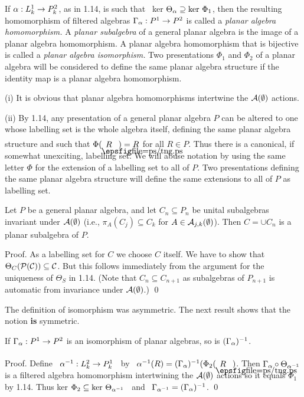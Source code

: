 If $\alpha: L^1_k\to P^2_k$, as in 1.14, is such that \
ker $\Theta_\alpha\supseteq {\bf\rm{ker}} \ \Phi_1$, then the resulting
homomorphism of filtered algebras $\Gamma_\alpha: P^1\to P^2$ is called
a {\it planar algebra homomorphism.} A {\it planar subalgebra}
of a general planar algebra is the image of a planar algebra
homomorphism. A planar algebra homomorphism that is bijective is
called a {\it planar algebra isomorphism.} Two presentations
$\Phi_1$ and $\Phi_2$ of a planar algebra will be considered to
define the same planar algebra structure if the identity map is a
planar algebra homomorphism.

 (i) It is obvious that
planar algebra homomorphisms intertwine the ${\cal A}(\emptyset)$ actions.

(ii) By 1.14, any presentation of a general planar algebra $P$ can
be altered to one whose labelling set is the whole algebra itself,
defining the same planar algebra structure and such that
$\Phi(\tangle{R})=R$ for all $R\in P$.  Thus
there is a canonical, if somewhat unexciting, labelling set.
We will abuse notation by using the same letter $\Phi$ for the
extension of a labelling set to all of $P$. Two presentations
defining the same planar algebra structure will define the same
extensions to all of $P$ as labelling set.

\bigskip
{} Let $P$ be a  general planar algebra,
and let $C_n\subseteq P_n$ be unital subalgebras invariant under
${\cal A}(\emptyset)$ (i.e., $\pi_A(C_j)\subseteq C_k$ for $A\in{\cal
A}_{j,k}(\emptyset)$). Then $C=\cup C_n$ is a planar subalgebra of $P$.

\bigskip
{\sc Proof.} As a labelling set for $C$ we choose $C$ itself.
We have to show that $\Theta_C(\cal P(C))\subseteq C$. But this follows
immediately from the argument for the uniqueness of $\Theta_S$ in
1.14. (Note that $C_n\subseteq C_{n+1}$ as subalgebras of
$P_{n+1}$ is automatic from invariance under ${\cal A}(\emptyset)$.) \qed

The definition of isomorphism
was asymmetric. The next result shows that the notion {\bf is}
symmetric.

\bs
{} If $\Gamma_{\alpha}:P^1\to P^2$ is an
isomorphism of planar algebras, so is $(\Gamma_{\alpha})^{-1}$.

\bs
{\sc Proof.} Define \ $\alpha^{-1}:L^2_k\to P^1_k$ \ by \
$\a^{-1}(R)=(\Gamma_{\a})^{-1}(\Phi_2(\tangle{R})$.
Then $\Gamma_\alpha\circ\Theta_{\alpha^{-1}}$ is a filtered algebra
homomorphism intertwining the ${\cal A}(\emptyset)$ actions so it equals
$\Phi_1$ by 1.14. Thus ker $\Phi_2\subseteq {\bf\rm{ker}} \
\Theta_{\alpha^{-1}}$ \ and \ $\Gamma_{\alpha^{-1}}=(\Gamma_\alpha)^{-1}$. \qed

